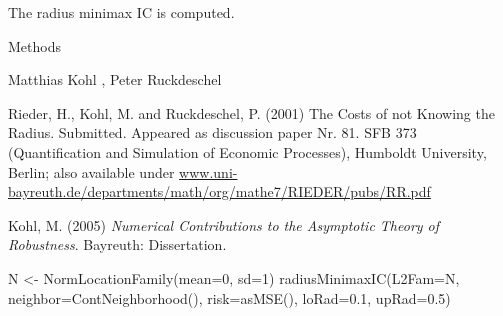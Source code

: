 \begin{Value}
The radius minimax IC is computed.
\end{Value}
\begin{Section}{Methods}
\end{Section}
\begin{Author}\relax
Matthias Kohl ,
Peter Ruckdeschel 
\end{Author}
\begin{References}\relax
Rieder, H., Kohl, M. and Ruckdeschel, P. (2001) The Costs of not Knowing
the Radius. Submitted. Appeared as discussion paper Nr. 81. 
SFB 373 (Quantification and Simulation of Economic Processes),
Humboldt University, Berlin; also available under
\url{www.uni-bayreuth.de/departments/math/org/mathe7/RIEDER/pubs/RR.pdf}

Kohl, M. (2005) \emph{Numerical Contributions to the Asymptotic Theory of Robustness}. 
Bayreuth: Dissertation.
\end{References}
\begin{SeeAlso}\relax
{}
\end{SeeAlso}
\begin{Examples}
\begin{ExampleCode}
N <- NormLocationFamily(mean=0, sd=1) 
radiusMinimaxIC(L2Fam=N, neighbor=ContNeighborhood(), 
                risk=asMSE(), loRad=0.1, upRad=0.5)
\end{ExampleCode}
\end{Examples}

